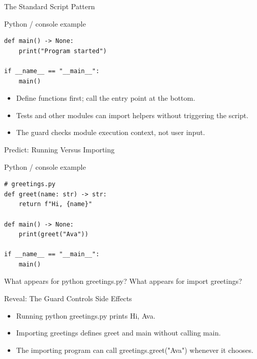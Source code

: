 \documentclass[aspectratio=169,10pt]{beamer}
\begin{document}
\begin{frame}[fragile]{The Standard Script Pattern}
\begin{block}{Python / console example}\begin{Verbatim}[fontsize=\footnotesize]
def main() -> None:
    print("Program started")

if __name__ == "__main__":
    main()
\end{Verbatim}
\end{block}
\begin{itemize}
\item Define functions first; call the entry point at the bottom.
\item Tests and other modules can import helpers without triggering the script.
\item The guard checks module execution context, not user input.
\end{itemize}
\end{frame}
\begin{frame}[fragile]{Predict: Running Versus Importing}
\begin{block}{Python / console example}\begin{Verbatim}[fontsize=\footnotesize]
# greetings.py
def greet(name: str) -> str:
    return f"Hi, {name}"

def main() -> None:
    print(greet("Ava"))

if __name__ == "__main__":
    main()
\end{Verbatim}
\end{block}
\begin{activity}What appears for python greetings.py? What appears for import greetings?\end{activity}
\end{frame}
\begin{frame}[fragile]{Reveal: The Guard Controls Side Effects}
\begin{itemize}
\item Running python greetings.py prints Hi, Ava.
\item Importing greetings defines greet and main without calling main.
\item The importing program can call greetings.greet("Ava") whenever it chooses.
\end{itemize}
\end{frame}
\end{document}

